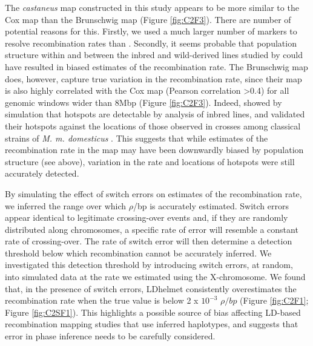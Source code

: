 The \textit{castaneus} map constructed in this study appears to be more similar to the Cox map than the Brunschwig map (Figure \ref{fig:C2F3}). There are number of potential reasons for this. Firstly, we used a much larger number of markers to resolve recombination rates than \cite{RN156}. Secondly, it seems probable that population structure within and between the inbred and wild-derived lines studied by \cite{RN156} could have resulted in biased estimates of the recombination rate. The Brunschwig map does, however, capture true variation in the recombination rate, since their map is also highly correlated with the Cox map (Pearson correlation >0.4) for all genomic windows wider than 8Mbp (Figure \ref{fig:C2F3}). Indeed, \cite{RN156} showed by simulation that hotspots are detectable by analysis of inbred lines, and validated their hotspots against the locations of those observed in crosses among classical strains of \textit{M. m. domesticus} \citep{RN180}. This suggests that while estimates of the recombination rate in the \cite{RN156} map may have been downwardly biased by population structure (see above), variation in the rate and locations of hotspots were still accurately detected.
 
By simulating the effect of switch errors on estimates of the recombination rate, we inferred the range over which $\rho$/bp is accurately estimated. Switch errors appear identical to legitimate crossing-over events and, if they are randomly distributed along chromosomes, a specific rate of error will resemble a constant rate of crossing-over. The rate of switch error will then determine a detection threshold below which recombination cannot be accurately inferred. We investigated this detection threshold by introducing switch errors, at random, into simulated data at the rate we estimated using the X-chromosome. We found that, in the presence of switch errors, LDhelmet consistently overestimates the recombination rate when the true value is below 2 x $10^{-3}$ $\rho /bp$ (Figure \ref{fig:C2F1}; Figure \ref{fig:C2SF1}). This highlights a possible source of bias affecting LD-based recombination mapping studies that use inferred haplotypes, and suggests that error in phase inference needs to be carefully considered.

